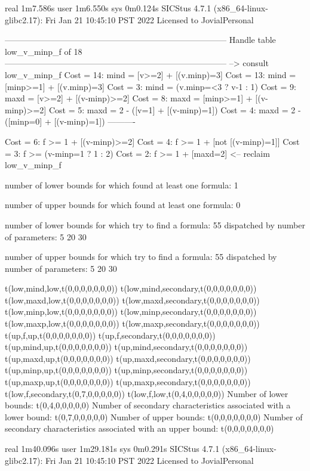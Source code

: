 real	1m7.586s
user	1m6.550s
sys	0m0.124s
SICStus 4.7.1 (x86_64-linux-glibc2.17): Fri Jan 21 10:45:10 PST 2022
Licensed to JovialPersonal


--------------------------------------------------------------------------------
Handle table low_v_minp_f of 18
--------------------------------------------------------------------------------
--> consult low_v_minp_f
Cost = 14:  mind = [v>=2] + [(v.minp)=3]
Cost = 13:  mind = [minp>=1] + [(v.minp)=3]
Cost =  3:  mind = (v.minp=<3 ? v-1 : 1)
Cost =  9:  maxd = [v>=2] + [(v-minp)>=2]
Cost =  8:  maxd = [minp>=1] + [(v-minp)>=2]
Cost =  5:  maxd = 2 - ([v=1] + [(v-minp)=1])
Cost =  4:  maxd = 2 - ([minp=0] + [(v-minp)=1])
----------

Cost =  6:  f >= 1 + [(v-minp)>=2]
Cost =  4:  f >= 1 + [not [(v-minp)=1]]
Cost =  3:  f >= (v-minp=1 ? 1 : 2)
Cost =  2:  f >= 1 + [maxd=2]
<-- reclaim low_v_minp_f

number of lower bounds for which found at least one formula: 1

number of upper bounds for which found at least one formula: 0

number of lower bounds for which try to find a formula: 55
dispatched by number of parameters: 5  20  30

number of upper bounds for which try to find a formula: 55
dispatched by number of parameters: 5  20  30

t(low,mind,low,t(0,0,0,0,0,0,0))
t(low,mind,secondary,t(0,0,0,0,0,0,0))
t(low,maxd,low,t(0,0,0,0,0,0,0))
t(low,maxd,secondary,t(0,0,0,0,0,0,0))
t(low,minp,low,t(0,0,0,0,0,0,0))
t(low,minp,secondary,t(0,0,0,0,0,0,0))
t(low,maxp,low,t(0,0,0,0,0,0,0))
t(low,maxp,secondary,t(0,0,0,0,0,0,0))
t(up,f,up,t(0,0,0,0,0,0,0))
t(up,f,secondary,t(0,0,0,0,0,0,0))
t(up,mind,up,t(0,0,0,0,0,0,0))
t(up,mind,secondary,t(0,0,0,0,0,0,0))
t(up,maxd,up,t(0,0,0,0,0,0,0))
t(up,maxd,secondary,t(0,0,0,0,0,0,0))
t(up,minp,up,t(0,0,0,0,0,0,0))
t(up,minp,secondary,t(0,0,0,0,0,0,0))
t(up,maxp,up,t(0,0,0,0,0,0,0))
t(up,maxp,secondary,t(0,0,0,0,0,0,0))
t(low,f,secondary,t(0,7,0,0,0,0,0))
t(low,f,low,t(0,4,0,0,0,0,0))
Number of lower bounds:                                             t(0,4,0,0,0,0,0)
Number of secondary characteristics associated with a lower bound:  t(0,7,0,0,0,0,0)
Number of upper bounds:                                             t(0,0,0,0,0,0,0)
Number of secondary characteristics associated with an upper bound: t(0,0,0,0,0,0,0)

real	1m40.096s
user	1m29.181s
sys	0m0.291s
SICStus 4.7.1 (x86_64-linux-glibc2.17): Fri Jan 21 10:45:10 PST 2022
Licensed to JovialPersonal


